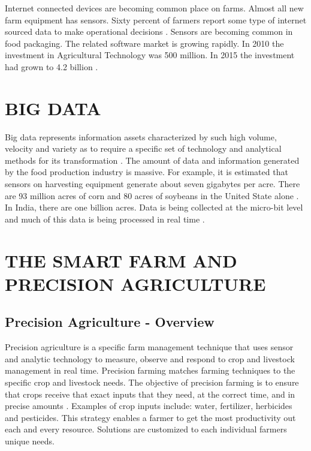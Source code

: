 \documentclass[sigconf]{acmart}
\begin{document}
Internet connected devices are becoming common place on farms. Almost all new farm equipment has sensors. Sixty percent of farmers report some type of internet sourced data to make operational decisions \cite{www-google-Farm}. Sensors are becoming common in food packaging.  The related software market is growing rapidly.  In 2010 the investment in Agricultural Technology was 500 million. In 2015 the investment had grown to 4.2 billion \cite{DevEcon}. 

\section{BIG DATA}

Big data represents information assets characterized by such high volume, velocity and variety as to require a specific set of technology and analytical methods for its transformation \cite{Wolfert}. The amount of data and information generated by the food production industry is massive. For example, it is estimated that sensors on harvesting equipment generate about seven gigabytes per acre. There are 93 million acres of corn and 80 acres of soybeans in the United State alone \cite{www-google-Farm}. In India, there are one billion acres. Data is being collected at the micro-bit level and much of this data is being processed in real time \cite{www-google-Crop}.  

\section{THE SMART FARM AND PRECISION AGRICULTURE}

\subsection{Precision Agriculture - Overview}

Precision agriculture is a specific farm management technique that uses sensor and analytic technology to measure, observe and respond to crop and livestock management in real time.  Precision farming matches farming techniques to the specific crop and livestock needs.  The objective of precision farming is to ensure that crops receive that exact inputs that they need, at the correct time, and in precise amounts \cite{www-google-Wikipedia}. Examples of crop inputs include: water, fertilizer, herbicides and pesticides.  This strategy enables a farmer to get the most productivity out each and every resource. Solutions are customized to each individual farmers unique needs.
\end{document}
